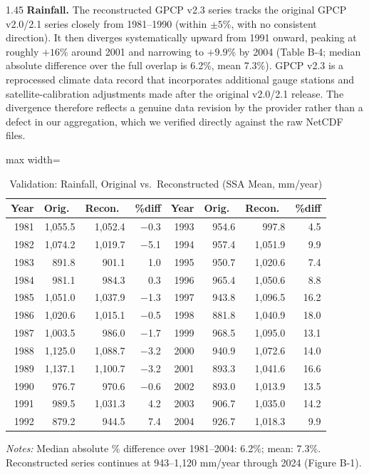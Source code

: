 \documentclass[12pt]{article}
\begin{document}
\begin{bibunit}[jpe]
\begin{spacing}{1.45}
\textbf{Rainfall.} The reconstructed GPCP v2.3 series tracks the original GPCP v2.0/2.1 series closely from 1981--1990 (within $\pm5\%$, with no consistent direction). It then diverges systematically upward from 1991 onward, peaking at roughly $+16\%$ around 2001 and narrowing to $+9.9\%$ by 2004 (Table B-4; median absolute difference over the full overlap is 6.2\%, mean 7.3\%). GPCP v2.3 is a reprocessed climate data record that incorporates additional gauge stations and satellite-calibration adjustments made after the original v2.0/2.1 release. The divergence therefore reflects a genuine data revision by the provider rather than a defect in our aggregation, which we verified directly against the raw NetCDF files.

\begin{table}[H]
\centering
\begin{adjustbox}{max width=\textwidth}
\begin{threeparttable}
\caption{Validation: Rainfall, Original vs.\ Reconstructed (SSA Mean, mm/year)}
\label{tab:B4}
\begin{tabular}{rrrr|rrrr}
\toprule
Year & Orig.\ & Recon.\ & \%diff & Year & Orig.\ & Recon.\ & \%diff \\
\midrule
1981 & 1{,}055.5 & 1{,}052.4 & $-$0.3  & 1993 & 954.6 & 997.8   & 4.5 \\
1982 & 1{,}074.2 & 1{,}019.7 & $-$5.1  & 1994 & 957.4 & 1{,}051.9 & 9.9 \\
1983 & 891.8   & 901.1   & 1.0   & 1995 & 950.7 & 1{,}020.6 & 7.4 \\
1984 & 981.1   & 984.3   & 0.3   & 1996 & 965.4 & 1{,}050.6 & 8.8 \\
1985 & 1{,}051.0 & 1{,}037.9 & $-$1.3  & 1997 & 943.8 & 1{,}096.5 & 16.2 \\
1986 & 1{,}020.6 & 1{,}015.1 & $-$0.5  & 1998 & 881.8 & 1{,}040.9 & 18.0 \\
1987 & 1{,}003.5 & 986.0   & $-$1.7  & 1999 & 968.5 & 1{,}095.0 & 13.1 \\
1988 & 1{,}125.0 & 1{,}088.7 & $-$3.2  & 2000 & 940.9 & 1{,}072.6 & 14.0 \\
1989 & 1{,}137.1 & 1{,}100.7 & $-$3.2  & 2001 & 893.3 & 1{,}041.6 & 16.6 \\
1990 & 976.7   & 970.6   & $-$0.6  & 2002 & 893.0 & 1{,}013.9 & 13.5 \\
1991 & 989.5   & 1{,}031.3 & 4.2   & 2003 & 906.7 & 1{,}035.0 & 14.2 \\
1992 & 879.2   & 944.5   & 7.4   & 2004 & 926.7 & 1{,}018.3 & 9.9 \\
\bottomrule
\end{tabular}
\begin{tablenotes}[flushleft]
\footnotesize
\item \textit{Notes:} Median absolute \% difference over 1981--2004: 6.2\%; mean: 7.3\%. Reconstructed series continues at 943--1{,}120 mm/year through 2024 (Figure B-1).
\end{tablenotes}
\end{threeparttable}
\end{adjustbox}
\end{table}


\end{spacing}
\end{bibunit}
\end{document}
